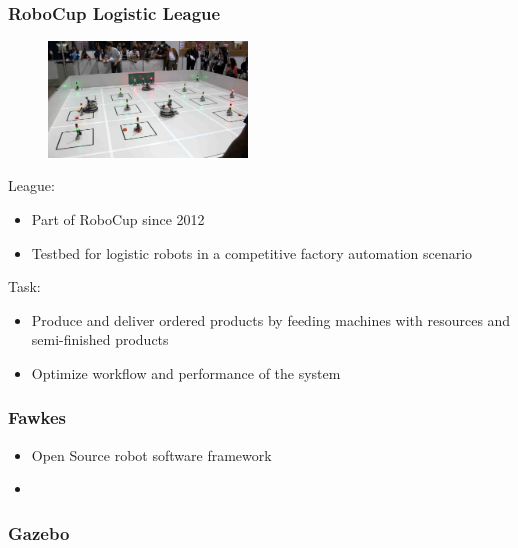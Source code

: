 \documentclass{beamer}
\begin{document}
\begin{frame}
\frametitle{RoboCup Logistic League}
\fboxsep=0pt
\noindent%
\begin{minipage}[]{0.48\linewidth}
\begin{figure}
\includegraphics[width=150pt,heigth=120pt]{pics/llsfLeague.png}\\
\end{figure}
\end{minipage}%
\hfill%
\begin{minipage}[]{0.48\linewidth}
League:
\begin{itemize}
\item Part of RoboCup since 2012
\item Testbed for logistic robots in a competitive factory automation scenario
\end{itemize}
Task:
\begin{itemize}
\item Produce and deliver ordered products by feeding machines with resources and semi-finished products
\item Optimize workflow and performance of the system
\end{itemize}
\end{minipage}
\end{frame}


\begin{frame}
\frametitle{Fawkes}
\begin{itemize}
\item Open Source robot software framework
\item 
\end{itemize}
\end{frame}

\begin{frame}
\frametitle{Gazebo}
\end{frame}
\end{document}
